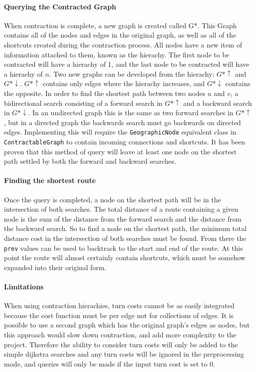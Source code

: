 \documentclass[11pt,twoside,a4paper]{report}
\begin{document}
\paragraph{Querying the Contracted Graph}
When contraction is complete, a new graph is created called G*. This Graph contains all of the nodes and edges in the original graph, as well as all of the shortcuts created during the contraction process.
All nodes have a new item of information attached to them, known as the hierachy. The first node to be contracted will have a hierachy of 1, and the last node to be contracted will have a hierachy of $n$. 
Two new graphs can be developed from the hierachy:
$G*\uparrow$ and $G*\downarrow$. $G*\uparrow$ contains only edges where the hierachy increases, and $G*\downarrow$ contains the opposite. In order to find the shortest path between two nodes $u$ and $v$, a bidirectional search
 consisting of a forward search in $G*\uparrow$ and a backward search in $G*\downarrow$. In an undirected graph this is the same as two forward searches in $G*\uparrow$, but in a directed graph the backwards search must go backwards on directed edges.
Implementing this will require the \texttt{GeographicNode} equivalent class in \texttt{ContractableGraph} to contain incoming connections and shortcuts. It has been proven\cite{Geisberger2012} that this method of query will leave at least one node on the shortest path settled by both the forward and backward searches.
\paragraph{Finding the shortest route}
Once the query is completed, a node on the shortest path will be in the intersection of both searches. The total distance of a route containing a given node is the sum of the distance from the forward search and the distance from the backward search. So to find a node on the shortest path,
the minimum total distance cost in the intersection of both searches must be found. From there the \texttt{prev} values can be used to backtrack to the start and end of the route. At this point the route will almost certainly contain shortcuts, which must be somehow expanded into their original form.
\paragraph{Limitations}
When using contraction hierachies, turn costs cannot be as easily integrated because the cost function must be per edge not for collections of edges. It is possible to use a second graph which has the original graph's edges as nodes, but this approach would slow down contraction, and add more complexity to the project.
Therefore the ability to consider turn costs will only be added to the simple dijkstra searches and any turn costs will be ignored in the preprocessing mode, and queries will only be made if the input turn cost is set to 0. 
\end{document}
